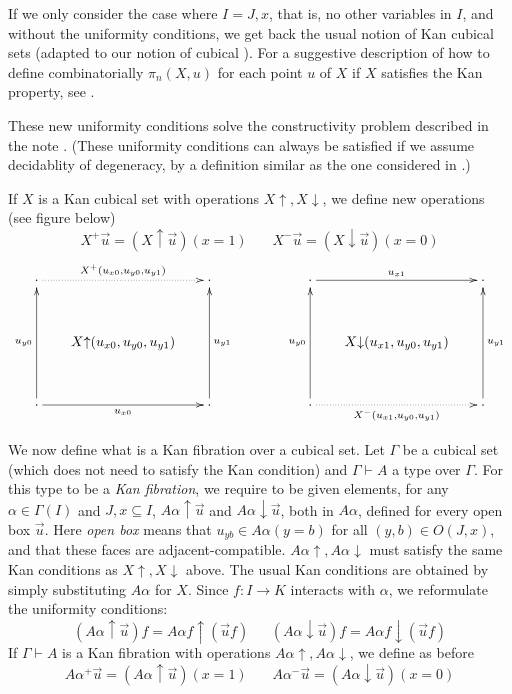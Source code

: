 \documentclass[10pt,a4paper]{article}
\newcommand{\rup}[1]{#1{\uparrow}}
\newcommand{\rdo}[1]{#1{\downarrow}}
\begin{document}
If we only consider the case where $I = J,x$, that is, no other
variables in $I$, and without the uniformity conditions, we get back
the usual notion of Kan cubical sets \cite[Section 4]{Kan} (adapted to
our notion of cubical ).  For a suggestive description of how to
define combinatorially $\pi_n(X,u)$ for each point $u$ of $X$ if $X$
satisfies the Kan property, see \cite{Williamson}.

 These new uniformity conditions solve the constructivity problem described in the note \cite{BC}.
(These uniformity conditions can always be satisfied if we assume decidablity of degeneracy, by a definition similar
as the one considered in \cite{BCH}.)

If $X$ is a Kan cubical set with operations $\rup{X},\rdo{X}$, we define new operations (see figure below)
$$
X^+\vec u = (\rup{X} \vec u)(x=1)~~~~~~~~X^-\vec u = (\rdo{X} \vec u)(x=0)$$
\def\noe{\cdot}
\[
\xymatrix@R=1.1cm@C=.6cm{
\noe\ar@{.>}[rr]^{X^+(u_{x0}, u_{y0},u_{y1})}&      & \noe                                     &&&
\noe\ar[rr]^{u_{x1}}                                 &      & \noe      \\
                                      &\rup{X}(u_{x0}, u_{y0},u_{y1})&                          &&&
                                      &\rdo{X}(u_{x1}, u_{y0},u_{y1})&                              \\
\noe\ar[rr]_{u_{x0}}\ar[uu]^{u_{y0}}&      & \noe\ar[uu]_{u_{y1}}                                     &&&
\noe\ar@{.>}[rr]_{X^-(u_{x1}, u_{y0},u_{y1})}\ar[uu]^{u_{y0}}     &      & \noe\ar[uu]_{u_{y1}}                       \\
}
\]

We now define what is a Kan fibration over a cubical set.  Let
$\Gamma$ be a cubical set (which does not need to satisfy the Kan
condition) and $\Gamma\vdash A$ a type over $\Gamma$.  For this type
to be a \emph{Kan fibration}, we require to be given elements, for any
$\alpha\in\Gamma(I)$ and $J,x\subseteq I$, $\rup{A\alpha} \vec u$ and
$\rdo{A\alpha} \vec u$, both in $A\alpha$, defined for every open box
$\vec u$.  Here \emph{open box} means that $u_{yb}\in A\alpha(y=b)$
for all $(y,b)\in O(J,x)$, and that these faces are
adjacent-compatible.  $\rup{A\alpha}, \rdo{A\alpha}$ must satisfy the
same Kan conditions as $ \rup{X},\rdo{X}$ above.  The usual Kan
conditions are obtained by simply substituting $A\alpha$ for $X$.
Since $f:I\to K$ interacts with $\alpha$, we reformulate the
uniformity conditions:
$$
(\rup{A\alpha} \vec u)f = \rup{A\alpha f} (\vec{u}f)~~~~~~~
(\rdo{A\alpha} \vec u)f = \rdo{A\alpha f} (\vec{u}f)
$$
If $\Gamma\vdash A$ is a Kan fibration with operations
$\rup{A\alpha},\rdo{A\alpha}$, we define as before
$$
A\alpha^+\vec u = (\rup{A\alpha} \vec u)(x=1)~~~~~~~~
A\alpha^-\vec u = (\rdo{A\alpha} \vec u)(x=0)
$$
\end{document}
